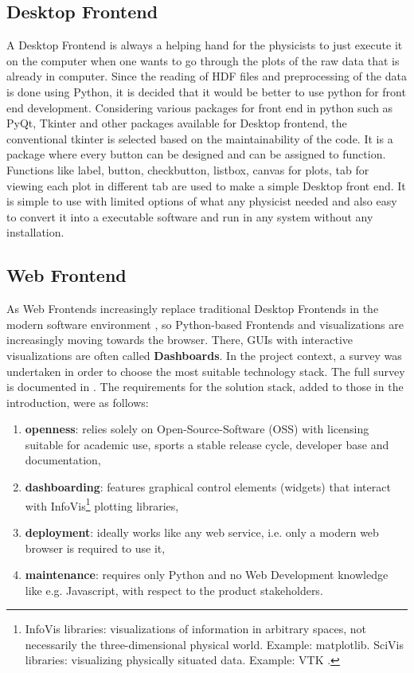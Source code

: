 \subsection{Desktop Frontend}
\label{sec:desktop-frontend}

A Desktop Frontend is always a helping hand for the physicists to just execute it on the computer when one wants to go through the plots of the raw data that is already in computer. 
Since the reading of HDF files and preprocessing of the data is done using Python, it is decided that it would be better to use python for front end development. Considering various packages for front end in python such as PyQt, Tkinter and other packages available for Desktop frontend, the conventional tkinter is selected based on the maintainability of the code. It is a package where every button can be designed and can be assigned to function.
Functions like label, button, checkbutton, listbox, canvas for plots, tab for viewing each plot in different tab are used to make a simple Desktop front end. It is simple to use with limited options of what any physicist needed and also easy to convert it into a executable software and run in any system without any installation.

\subsection{Web Frontend}
\label{sec:web-frontend}

As Web Frontends increasingly replace traditional Desktop Frontends in the
modern software environment \cite{web-vs-desktop}, so Python-based Frontends and
visualizations are increasingly moving towards the browser. There, GUIs with
interactive visualizations are often called \textbf{Dashboards}. In the project
context, a survey was undertaken in order to choose the most suitable technology
stack. The full survey is documented in \cite{jw-notes}. The requirements for
the solution stack, added to those in the introduction, were as follows:

\begin{enumerate}
\item \textbf{openness}: relies solely on Open-Source-Software (OSS) with
    licensing suitable for academic use, sports a stable release cycle, developer
    base and documentation,
\item \textbf{dashboarding}: features graphical control elements (widgets) that
    interact with InfoVis\footnote{InfoVis libraries: visualizations of
      information in arbitrary spaces, not necessarily the three-dimensional
      physical world. Example: matplotlib. SciVis libraries: visualizing
      physically situated data. Example: VTK \cite{python-viz-2018}.} plotting
    libraries,
\item \textbf{deployment}: ideally works like any web service, i.e. only a
    modern web browser is required to use it,
\item \textbf{maintenance}: requires only Python and no Web Development
    knowledge like e.g. Javascript, with respect to the product stakeholders.
\end{enumerate}

